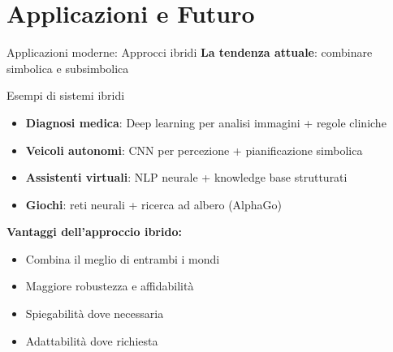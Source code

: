 \documentclass[aspectratio=169,12pt]{beamer}
\begin{document}
\section{Applicazioni e Futuro}
%
%
\begin{frame}{Applicazioni moderne: Approcci ibridi}
    \textbf{La tendenza attuale}: combinare simbolica e subsimbolica
    
    \vspace{0.3cm}
    
    \begin{exampleblock}{Esempi di sistemi ibridi}
        \begin{itemize}
            \item \textbf{Diagnosi medica}: Deep learning per analisi immagini + regole cliniche
            \item \textbf{Veicoli autonomi}: CNN per percezione + pianificazione simbolica
            \item \textbf{Assistenti virtuali}: NLP neurale + knowledge base strutturati
            \item \textbf{Giochi}: reti neurali + ricerca ad albero (AlphaGo)
        \end{itemize}
    \end{exampleblock}
    
    \vspace{0.3cm}
    
    \textbf{Vantaggi dell'approccio ibrido:}
    \begin{itemize}
        \item Combina il meglio di entrambi i mondi
        \item Maggiore robustezza e affidabilità
        \item Spiegabilità dove necessaria
        \item Adattabilità dove richiesta
    \end{itemize}
\end{frame}
%
%
\end{document}
